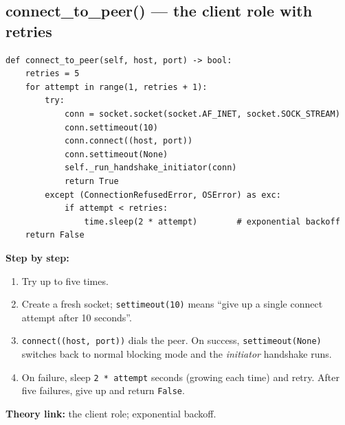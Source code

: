 \documentclass[11pt,a4paper]{article}
\begin{document}
\subsection{connect\_to\_peer() --- the client role with retries}
\begin{lstlisting}[style=py,caption={vehicle\_node.py --- connecting to a peer, with backoff.}]
def connect_to_peer(self, host, port) -> bool:
    retries = 5
    for attempt in range(1, retries + 1):
        try:
            conn = socket.socket(socket.AF_INET, socket.SOCK_STREAM)
            conn.settimeout(10)
            conn.connect((host, port))
            conn.settimeout(None)
            self._run_handshake_initiator(conn)
            return True
        except (ConnectionRefusedError, OSError) as exc:
            if attempt < retries:
                time.sleep(2 * attempt)        # exponential backoff
    return False
\end{lstlisting}
\textbf{Step by step:}
\begin{enumerate}
  \item Try up to five times.
  \item Create a fresh socket; \texttt{settimeout(10)} means ``give up a single
        connect attempt after 10 seconds''.
  \item \texttt{connect((host, port))} dials the peer. On success,
        \texttt{settimeout(None)} switches back to normal blocking mode and the
        \emph{initiator} handshake runs.
  \item On failure, sleep \texttt{2 * attempt} seconds (growing each time) and
        retry. After five failures, give up and return \texttt{False}.
\end{enumerate}
\textbf{Theory link:} the client role; exponential backoff.
\end{document}
